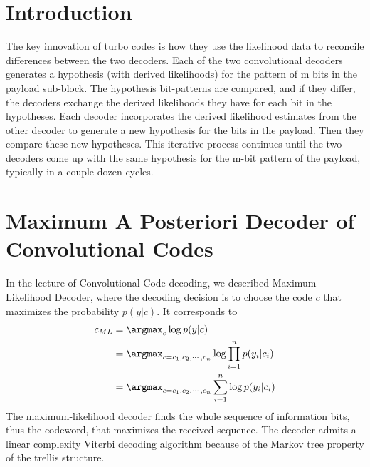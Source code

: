 \Contributor{}

\lstset{style=mystyle}

	\MakeScribeTop


\section{Introduction}
The key innovation of turbo codes is how they use the likelihood data to reconcile differences between the two decoders. Each of the two convolutional decoders generates a hypothesis (with derived likelihoods) for the pattern of m bits in the payload sub-block. The hypothesis bit-patterns are compared, and if they differ, the decoders exchange the derived likelihoods they have for each bit in the hypotheses. Each decoder incorporates the derived likelihood estimates from the other decoder to generate a new hypothesis for the bits in the payload. Then they compare these new hypotheses. This iterative process continues until the two decoders come up with the same hypothesis for the m-bit pattern of the payload, typically in a couple dozen cycles.

\section{Maximum A Posteriori Decoder of Convolutional Codes}
In the lecture of Convolutional Code decoding, we described Maximum Likelihood Decoder, where the decoding decision is to choose the code \(c\) that maximizes the probability \(p(y|c)\). It corresponds to  
\begin{align}
    c_{ML} &= \argmax_{c} \log p(y|c) \nonumber \\ 
           &= \argmax_{c=c_1, c_2, \cdots, c_n} \log \prod_{i=1}^{n}p(y_i|c_i) \nonumber \\
           &= \argmax_{c=c_1, c_2, \cdots, c_n} \sum_{i=1}^{n} \log p(y_i|c_i) \label{eq:ML_Viterbi}
\end{align}
The maximum-likelihood decoder finds the whole sequence of information bits, thus the codeword, that maximizes the received sequence. The decoder admits a linear complexity Viterbi decoding algorithm because of the Markov tree property of the trellis structure. 

